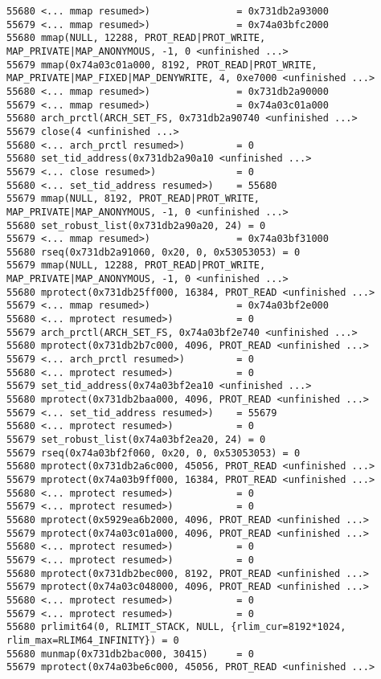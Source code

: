 \begin{verbatim}
55680 <... mmap resumed>)               = 0x731db2a93000
55679 <... mmap resumed>)               = 0x74a03bfc2000
55680 mmap(NULL, 12288, PROT_READ|PROT_WRITE, MAP_PRIVATE|MAP_ANONYMOUS, -1, 0 <unfinished ...>
55679 mmap(0x74a03c01a000, 8192, PROT_READ|PROT_WRITE, MAP_PRIVATE|MAP_FIXED|MAP_DENYWRITE, 4, 0xe7000 <unfinished ...>
55680 <... mmap resumed>)               = 0x731db2a90000
55679 <... mmap resumed>)               = 0x74a03c01a000
55680 arch_prctl(ARCH_SET_FS, 0x731db2a90740 <unfinished ...>
55679 close(4 <unfinished ...>
55680 <... arch_prctl resumed>)         = 0
55680 set_tid_address(0x731db2a90a10 <unfinished ...>
55679 <... close resumed>)              = 0
55680 <... set_tid_address resumed>)    = 55680
55679 mmap(NULL, 8192, PROT_READ|PROT_WRITE, MAP_PRIVATE|MAP_ANONYMOUS, -1, 0 <unfinished ...>
55680 set_robust_list(0x731db2a90a20, 24) = 0
55679 <... mmap resumed>)               = 0x74a03bf31000
55680 rseq(0x731db2a91060, 0x20, 0, 0x53053053) = 0
55679 mmap(NULL, 12288, PROT_READ|PROT_WRITE, MAP_PRIVATE|MAP_ANONYMOUS, -1, 0 <unfinished ...>
55680 mprotect(0x731db25ff000, 16384, PROT_READ <unfinished ...>
55679 <... mmap resumed>)               = 0x74a03bf2e000
55680 <... mprotect resumed>)           = 0
55679 arch_prctl(ARCH_SET_FS, 0x74a03bf2e740 <unfinished ...>
55680 mprotect(0x731db2b7c000, 4096, PROT_READ <unfinished ...>
55679 <... arch_prctl resumed>)         = 0
55680 <... mprotect resumed>)           = 0
55679 set_tid_address(0x74a03bf2ea10 <unfinished ...>
55680 mprotect(0x731db2baa000, 4096, PROT_READ <unfinished ...>
55679 <... set_tid_address resumed>)    = 55679
55680 <... mprotect resumed>)           = 0
55679 set_robust_list(0x74a03bf2ea20, 24) = 0
55679 rseq(0x74a03bf2f060, 0x20, 0, 0x53053053) = 0
55680 mprotect(0x731db2a6c000, 45056, PROT_READ <unfinished ...>
55679 mprotect(0x74a03b9ff000, 16384, PROT_READ <unfinished ...>
55680 <... mprotect resumed>)           = 0
55679 <... mprotect resumed>)           = 0
55680 mprotect(0x5929ea6b2000, 4096, PROT_READ <unfinished ...>
55679 mprotect(0x74a03c01a000, 4096, PROT_READ <unfinished ...>
55680 <... mprotect resumed>)           = 0
55679 <... mprotect resumed>)           = 0
55680 mprotect(0x731db2bec000, 8192, PROT_READ <unfinished ...>
55679 mprotect(0x74a03c048000, 4096, PROT_READ <unfinished ...>
55680 <... mprotect resumed>)           = 0
55679 <... mprotect resumed>)           = 0
55680 prlimit64(0, RLIMIT_STACK, NULL, {rlim_cur=8192*1024, rlim_max=RLIM64_INFINITY}) = 0
55680 munmap(0x731db2bac000, 30415)     = 0
55679 mprotect(0x74a03be6c000, 45056, PROT_READ <unfinished ...>

\end{verbatim}
